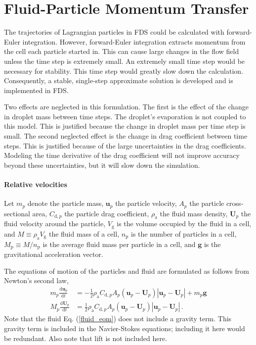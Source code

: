 \chapter{Fluid-Particle Momentum Transfer}

The trajectories of Lagrangian particles in FDS could be calculated with forward-Euler integration. However, forward-Euler integration extracts momentum from the cell each particle started in. This can cause large changes in the flow field unless the time step is extremely small. An extremely small time step would be necessary for stability. This time step would greatly slow down the calculation. Consequently, a stable, single-step approximate solution is developed and is implemented in FDS.

Two effects are neglected in this formulation. The first is the effect of the change in droplet mass between  time steps. The droplet's evaporation is not coupled to this model. This is justified because the change in droplet mass per time step is small. The second neglected effect is the change in drag coefficient between time steps. This is justified because of the large uncertainties in the drag coefficients. Modeling the time derivative of the drag coefficient will not improve accuracy beyond these uncertainties, but it will slow down the simulation.

\subsubsection{Relative velocities}
Let $m_p$ denote the particle mass, $\mathbf{u}_p$ the particle velocity, $A_p$ the particle cross-sectional area, $C_{\text{d},p}$ the particle drag coefficient, $\rho_\text{a}$ the fluid mass density, $\mathbf{U}_p$ the fluid velocity around the particle, $V_\text{g}$ is the volume occupied by the fluid in a cell, and $M \equiv \rho_\text{a} V_\text{g}$ the fluid mass of a cell, $n_\text{p}$ is the number of particles in a cell, $M_\text{p} \equiv M/n_\text{p}$ is the average fluid mass per particle in a cell, and $\mathbf{g}$ is the gravitational acceleration vector.

The equations of motion of the particles and fluid are formulated as follows from Newton's second law,
\begin{align}
    \label{particle_eom}
    m_p \frac{\text{d} \mathbf{u}_p}{\text{d} t} &= - \frac{1}{2} \rho_\text{a} C_{\text{d},p} A_p (\mathbf{u}_p - \mathbf{U}_p) |\mathbf{u}_p - \mathbf{U}_p| + m_p \mathbf{g} \\
    \label{fluid_eom}
    M_p \frac{\text{d} \mathbf{U}_p}{\text{d} t} &= \frac{1}{2} \rho_\text{a} C_{\text{d},p} A_p (\mathbf{u}_p - \mathbf{U}_p) |\mathbf{u}_p - \mathbf{U}_p| \,.
\end{align}
Note that the fluid Eq. (\ref{fluid_eom}) does not include a gravity term. This gravity term is included in the Navier-Stokes equations; including it here would be redundant. Also note that lift is not included here.

